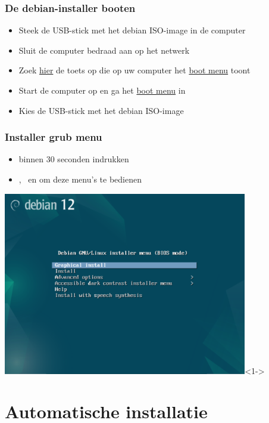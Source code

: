 \documentclass{beamer}
\begin{document}
\begin{frame}
  \frametitle{De \textbf{debian-installer} booten}
  \begin{itemize}
    \item Steek de USB-stick met het debian ISO-image in de computer
    \item Sluit de computer bedraad aan op het netwerk
    \item Zoek \href{https://www.boot-disk.com/quest_bootmenu.htm}{hier} de toets op die op uw computer het \href{https://www.boot-disk.com/quest_bootmenu.htm}{boot menu} toont
    \item Start de computer op en ga het \href{https://www.boot-disk.com/quest_bootmenu.htm}{boot menu} in
    \item Kies de USB-stick met het debian ISO-image
  \end{itemize}

\end{frame}


\begin{frame}
  \frametitle{Installer grub menu}
  \begin{itemize}
    \item<2-> binnen 30 seconden \DArrow indrukken
    \item<3> \DArrow, \UArrow\  en \Enter om deze menu's te bedienen
  \end{itemize}
  
  \centering
  \includegraphics[width=0.8\textwidth]{img/installer-grub-menu.png}<1->
\end{frame}

\section{Automatische installatie}
\end{document}
